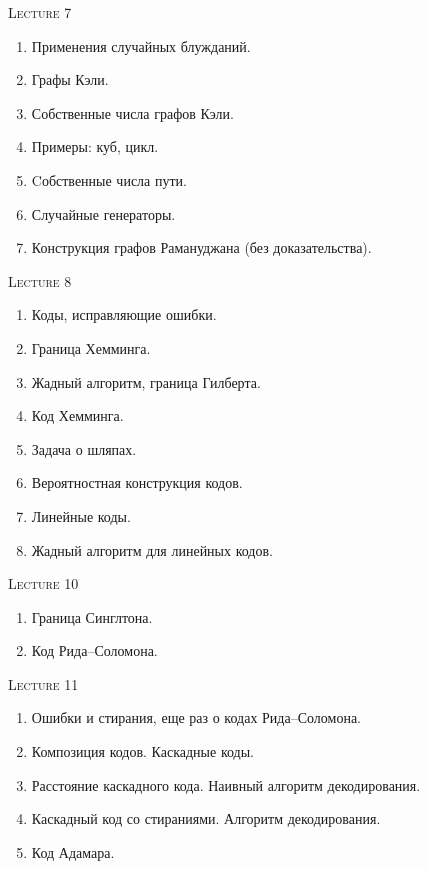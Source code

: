 \centerline{\textsc{Lecture 7}}

\begin{enumerate}
    \item Применения случайных блужданий. 
    \item Графы Кэли. 
    \item Собственные числа графов Кэли. 
    \item Примеры: куб, цикл. 
    \item Cобственные числа пути. 
    \item Случайные генераторы. 
    \item Конструкция графов Рамануджана (без доказательства). 
\end{enumerate}

\centerline{\textsc{Lecture 8} }

\begin{enumerate}
    \item Коды, исправляющие ошибки.
    \item Граница Хемминга.
    \item Жадный алгоритм, граница Гилберта.
    \item Код Хемминга.
    \item Задача о шляпах. 
    \item Вероятностная конструкция кодов.
    \item Линейные коды.
    \item Жадный алгоритм для линейных кодов.
\end{enumerate}


\centerline{\textsc{Lecture 10}}

\begin{enumerate}
    \item Граница Синглтона.
    \item Код Рида--Соломона.
\end{enumerate}

\centerline{\textsc{Lecture 11}}

\begin{enumerate}
    \item Ошибки и стирания, еще раз о кодах Рида--Соломона.
    \item Композиция кодов. Каскадные коды.
    \item Расстояние каскадного кода. Наивный алгоритм декодирования.
    \item Каскадный код со стираниями. Алгоритм декодирования.
    \item Код Адамара.
\end{enumerate}

